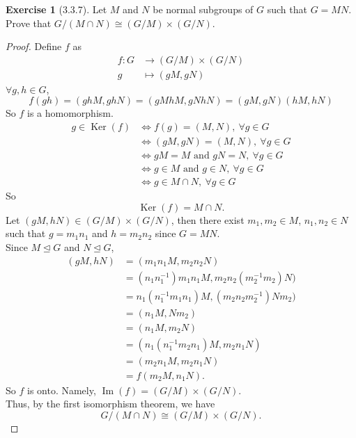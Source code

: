 \documentclass[14pt]{amsart}
\renewcommand{\ker}{\operatorname{Ker}}
\newcommand{\im}{\operatorname{Im}}
\theoremstyle{plain}
\theoremstyle{definition}
\newtheorem{exer}[lem]{Exercise}
\begin{document}
\begin{exer}[3.3.7]
Let $M$ and $N$ be normal subgroups of $G$ such that $G=MN$. Prove that $G/(M\cap N)\cong (G/M)\times(G/N)$. 
\begin{proof}
	Define $f$ as 
	\begin{align*}
	  f: G &\to (G/M) \times (G/N) \\
	  			g &\mapsto (gM, gN)
	\end{align*}
	$\forall g,h \in G$, 
	\[ f(gh) = (ghM, ghN) = (gMhM, gNhN) = (gM,gN)(hM, hN) \]
	So $f$ is a homomorphism.\\
	\begin{align*}
		g \in \ker(f) &\Leftrightarrow f(g) = (M,N),~\forall g \in G \\
	  	&\Leftrightarrow  (gM, gN) = (M,N), ~\forall g \in G\\
	  &\Leftrightarrow gM = M \text{ and } gN = N,~\forall g \in G\\
	  &\Leftrightarrow g \in M \text{ and } g\in N,~\forall g \in G\\
	  &\Leftrightarrow g \in M\cap N,~\forall g \in G
  	\end{align*}
  	So 
  	\[\ker(f) = M \cap N.\]
  	Let $(gM,hN) \in (G/M) \times (G/N)$, then there exist $m_1,m_2 \in M$, $n_1,n_2 \in N$ such that $g= m_1n_1$ and $h=m_2n_2$ since $G = MN$.\\
	Since $M \unlhd G$ and $N \unlhd G$,
	\begin{align*}
	  (gM,hN) & = (m_1n_1M,m_2n_2N)\\
	  		 	  	 &=(n_1n_1^{-1})m_1n_1M, m_2n_2(m_2^{-1}m_2)N) \\
	  			 	   &=n_1(n_1^{-1}m_1n_1)M, (m_2n_2m_2^{-1})Nm_2)\\
	  			 	  &=(n_1M, Nm_2)\\
	  				&=(n_1M, m_2N)\\
	  				&= (n_1(n_1^{-1}m_2n_1)M, m_2n_1N) \\
	  				&=(m_2n_1M,m_2n_1N)\\
	  				&=f(m_2M, n_1N).
	\end{align*}
	So $f$ is onto. Namely, $\im(f) = (G/M) \times (G/N)$.\\
	Thus, by the first isomorphism theorem, we have
	\[ G/(M\cap N)\cong (G/M)\times(G/N). \]
\end{proof}
\end{exer}
\end{document}
